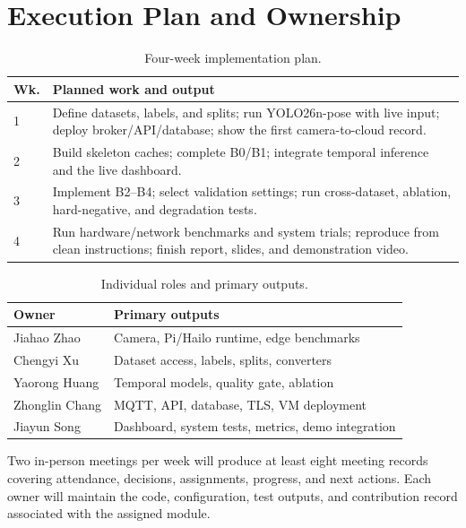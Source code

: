 \section{Execution Plan and Ownership}

\begin{table}[H]
\caption{Four-week implementation plan.}
\label{tab:schedule}
\centering
\footnotesize
\begin{tabularx}{\columnwidth}{@{}p{}X@{}}
\toprule
Wk. & Planned work and output \\
\midrule
1 & Define datasets, labels, and splits; run YOLO26n-pose with live input; deploy broker/API/database; show the first camera-to-cloud record. \\
2 & Build skeleton caches; complete B0/B1; integrate temporal inference and the live dashboard. \\
3 & Implement B2--B4; select validation settings; run cross-dataset, ablation, hard-negative, and degradation tests. \\
4 & Run hardware/network benchmarks and system trials; reproduce from clean instructions; finish report, slides, and demonstration video. \\
\bottomrule
\end{tabularx}
\end{table}

\begin{table}[H]
\caption{Individual roles and primary outputs.}
\label{tab:roles}
\centering
\footnotesize
\begin{tabularx}{\columnwidth}{@{}p{}X@{}}
\toprule
Owner & Primary outputs \\
\midrule
Jiahao Zhao & Camera, Pi/Hailo runtime, edge benchmarks \\
Chengyi Xu & Dataset access, labels, splits, converters \\
Yaorong Huang & Temporal models, quality gate, ablation \\
Zhonglin Chang & MQTT, API, database, TLS, VM deployment \\
Jiayun Song & Dashboard, system tests, metrics, demo integration \\
\bottomrule
\end{tabularx}
\end{table}

Two in-person meetings per week will produce at least eight meeting records covering attendance, decisions, assignments, progress, and next actions. Each owner will maintain the code, configuration, test outputs, and contribution record associated with the assigned module.
